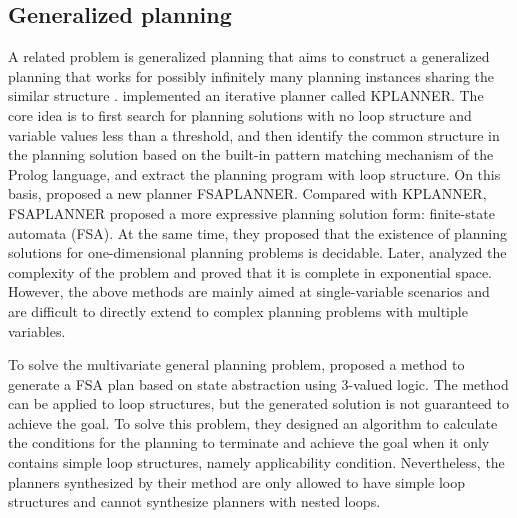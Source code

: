 \documentclass[review]{elsarticle}
\begin{document}
\subsection{Generalized planning} 
A related problem is generalized planning that aims to construct a generalized planning that works for possibly infinitely many planning instances sharing the similar structure \cite{Lev2005}.
\citet{Lev2005} implemented an iterative planner called KPLANNER. The core idea is to first search for planning solutions with no loop structure and variable values less than a threshold, and then identify the common structure in the planning solution based on the built-in pattern matching mechanism of the Prolog language, and extract the planning program with loop structure. On this basis, \citet{HuL2010} proposed a new planner FSAPLANNER. Compared with KPLANNER, FSAPLANNER proposed a more expressive planning solution form: finite-state automata (FSA). At the same time, they proposed that the existence of planning solutions for one-dimensional planning problems is decidable. Later, \citet{HuG2011} analyzed the complexity of the problem and proved that it is complete in exponential space. However, the above methods are mainly aimed at single-variable scenarios and are difficult to directly extend to complex planning problems with multiple variables.

To solve the multivariate general planning problem, \citet{SriIZ2011} proposed a method to generate a FSA plan based on state abstraction using 3-valued logic. The method can be applied to loop structures, but the generated solution is not guaranteed to achieve the goal. To solve this problem, they designed an algorithm to calculate the conditions for the planning to terminate and achieve the goal when it only contains simple loop structures, namely applicability
condition\cite{SriIZ2012}. Nevertheless, the planners synthesized by their method are only allowed to have simple loop structures and cannot synthesize planners with nested loops.
\end{document}

